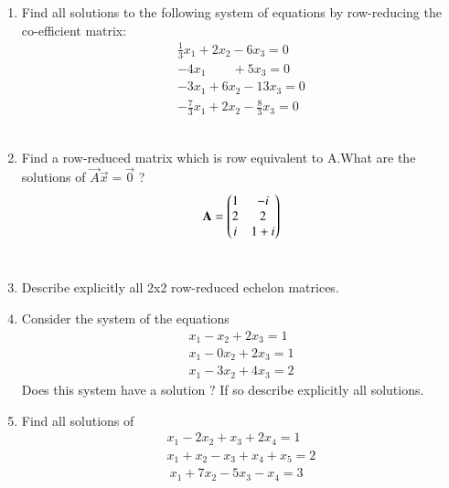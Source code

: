 \renewcommand{\theequation}{\theenumi}
\renewcommand{\thefigure}{\theenumi}
\begin{enumerate}[label=\thesubsection.\arabic*.,ref=\thesubsection.\theenumi]
%
\item Find all solutions to the following system of equations by row-reducing the co-efficient matrix:
\begin{align}
\frac{1}{3}x_1 +2x_2 - 6x_3 =0\\
-4x_1\quad \quad+ 5x_3=0\\
-3x_1+6x_2-13x_3=0\\
-\frac{7}{3}x_1 +2x_2 - \frac{8}{3}x_3 =0
\end{align}
\\
\solution

%
\item Find a row-reduced matrix which is row equivalent to A.What are the solutions of 
$\vec{A}\vec{x}=\vec{0}$ ?
\begin{align}
\mathbf{A} = \begin{pmatrix}1&-i\\2&2\\i& 1+i\end{pmatrix}\label{eq:solutions/1/3/2/A}
\end{align}
%
\\
\solution

%
\item  Describe explicitly all 2x2 row-reduced echelon matrices.
%
\\
\solution

\item 
Consider the system of the equations
\begin{align}
x_1 - x_2 +2x_3 = 1  \label{eq:solutions/1/3/4/1.1} \\
x_1 - 0x_2 + 2x_3 = 1 \label{eq:solutions/1/3/4/1.2} \\
x_1 -3x_2 + 4x_3 = 2 \label{eq:solutions/1/3/4/1.3}
\end{align}
%
Does this system have a solution $?$  If   so describe explicitly all solutions.
%
\\
\solution

%
\item Find all solutions of
 \begin{align}
 x_1-2x_2+x_3+2x_4=1 \nonumber\\
 x_1+x_2-x_3+x_4+x_5=2\nonumber\\\
 x_1+7x_2-5x_3-x_4=3\nonumber\
 \end{align}
%
\\
\solution


\end{enumerate}
